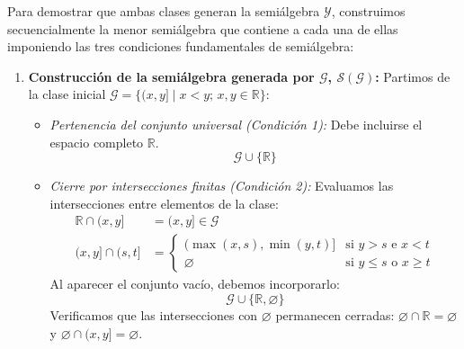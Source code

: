 \begin{demostracion}
Para demostrar que ambas clases generan la semiálgebra $\mathcal{Y}$, construimos secuencialmente la menor semiálgebra que contiene a cada una de ellas imponiendo las tres condiciones fundamentales de semiálgebra:

\begin{enumerate}[label=\arabic*)]
    \item \textbf{Construcción de la semiálgebra generada por $\mathcal{G}$, $\mathcal{S}(\mathcal{G})$:}
    Partimos de la clase inicial $\mathcal{G} = \{ (x,y] \mid x < y; \, x,y \in \mathbb{R} \}$:
    \begin{itemize}
        \item \textit{Pertenencia del conjunto universal (Condición 1):} Debe incluirse el espacio completo $\mathbb{R}$.
        \[
            \mathcal{G} \cup \{ \mathbb{R} \}
        \]
        \item \textit{Cierre por intersecciones finitas (Condición 2):}
        Evaluamos las intersecciones entre elementos de la clase:
        \begin{align*}
            \mathbb{R} \cap (x,y] &= (x,y] \in \mathcal{G} \\
            (x,y] \cap (s,t] &= \begin{cases}
                (\max(x,s), \min(y,t)] & \text{si } y > s \text{ e } x < t \\
                \varnothing & \text{si } y \le s \text{ o } x \ge t
            \end{cases}
        \end{align*}
        Al aparecer el conjunto vacío, debemos incorporarlo:
        \[
            \mathcal{G} \cup \{ \mathbb{R}, \varnothing \}
        \]
        Verificamos que las intersecciones con $\varnothing$ permanecen cerradas: $\varnothing \cap \mathbb{R} = \varnothing$ y $\varnothing \cap (x,y] = \varnothing$.


\end{itemize}
\end{enumerate}
\end{demostracion}
